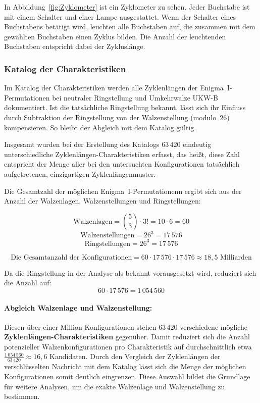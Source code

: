 \documentclass[12pt, ngerman, a4paper, numbers=noenddot]{article}
\begin{document}
In Abbildung~\ref{fig:Zyklometer} ist ein Zyklometer zu sehen. Jeder Buchstabe ist mit einem Schalter und einer Lampe ausgestattet. Wenn der Schalter eines Buchstabens betätigt wird, leuchten alle Buchstaben auf, die zusammen mit dem gewählten Buchstaben einen Zyklus bilden. Die Anzahl der leuchtenden Buchstaben entspricht dabei der Zykluslänge.






\subsubsection{Katalog der Charakteristiken}

Im Katalog der Charakteristiken werden alle Zyklenlängen der Enigma~I-Permutationen bei neutraler Ringstellung und Umkehrwalze UKW-B dokumentiert. Ist die tatsächliche Ringstellung bekannt, lässt sich ihr Einfluss durch Subtraktion der Ringstellung von der Walzenstellung (modulo~26) kompensieren. So bleibt der Abgleich mit dem Katalog gültig.



Insgesamt wurden bei der Erstellung des Katalogs \(63\,420\) eindeutig unterschiedliche Zyklenlängen-Charakteristiken erfasst, das heißt, diese Zahl entspricht der Menge aller bei den untersuchten Konfigurationen tatsächlich aufgetretenen, einzigartigen Zyklenlängenmuster.





Die Gesamtzahl der möglichen Enigma~I-Permutationenn ergibt sich aus der Anzahl der Walzenlagen, Walzenstellungen und Ringstellungen:

\[
\text{Walzenlagen} = \binom{5}{3} \cdot 3! = 10 \cdot 6 = 60
\]
\[
\text{Walzenstellungen} = 26^3 = 17\,576
\]
\[
\text{Ringstellungen} = 26^3 = 17\,576
\]

\[
\text{Die Gesamtanzahl der Konfigurationen} = 60 \cdot 17\,576 \cdot 17\,576 \approx 18{,}5 \text{ Milliarden}
\]

Da die Ringstellung in der Analyse als bekannt vorausgesetzt wird, reduziert sich die Anzahl auf:
\[
60 \cdot 17\,576 = 1\,054\,560
\]

\paragraph{Abgleich Walzenlage und Walzenstellung:}

Diesen über einer Million Konfigurationen stehen \(63\,420\) verschiedene mögliche \textbf{Zyklenlängen\hyp{}Charakteristiken} gegenüber. Damit reduziert sich die Anzahl potenzieller Walzenkonfigurationen pro Charakteristik auf durchschnittlich etwa \(\frac{1\,054\,560}{63\,420} \approx 16{,}6\) Kandidaten. Durch den Vergleich der Zyklenlängen der verschlüsselten Nachricht mit dem Katalog lässt sich die Menge der möglichen Konfigurationen somit deutlich eingrenzen. Diese Auswahl bildet die Grundlage für weitere Analysen, um die exakte Walzenlage und Walzenstellung zu bestimmen.
\end{document}
